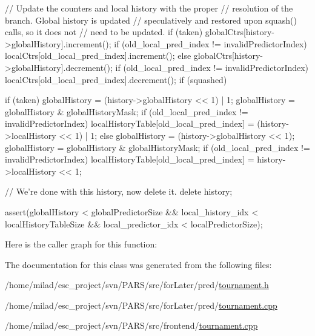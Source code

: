 \begin{DoxyCode}
{{{             // Update the counters and local history with the proper
             // resolution of the branch.  Global history is updated
             // speculatively and restored upon squash() calls, so it does not
             // need to be updated.
             if (taken) {
                  globalCtrs[history->globalHistory].increment();
                  if (old_local_pred_index != invalidPredictorIndex) {
                          localCtrs[old_local_pred_index].increment();
                  }
             } else {
                  globalCtrs[history->globalHistory].decrement();
                  if (old_local_pred_index != invalidPredictorIndex) {
                          localCtrs[old_local_pred_index].decrement();
                  }
             }
        }
        if (squashed) {
             if (taken) {
                globalHistory = (history->globalHistory << 1) | 1;
                globalHistory = globalHistory & globalHistoryMask;
                if (old_local_pred_index != invalidPredictorIndex) {
                    localHistoryTable[old_local_pred_index] =
                     (history->localHistory << 1) | 1;
                }
             } else {
                globalHistory = (history->globalHistory << 1);
                globalHistory = globalHistory & globalHistoryMask;
                if (old_local_pred_index != invalidPredictorIndex) {
                     localHistoryTable[old_local_pred_index] =
                     history->localHistory << 1;
                }
             }

        }
        // We're done with this history, now delete it.
        delete history;

    }

    assert(globalHistory < globalPredictorSize &&
           local_history_idx < localHistoryTableSize &&
           local_predictor_idx < localPredictorSize);


}
\end{DoxyCode}


Here is the caller graph for this function:




The documentation for this class was generated from the following files:\begin{DoxyCompactItemize}
\item 
/home/milad/esc\_\-project/svn/PARS/src/forLater/pred/\hyperlink{tournament_8h}{tournament.h}\item 
/home/milad/esc\_\-project/svn/PARS/src/forLater/pred/\hyperlink{forLater_2pred_2tournament_8cpp}{tournament.cpp}\item 
/home/milad/esc\_\-project/svn/PARS/src/frontend/\hyperlink{frontend_2tournament_8cpp}{tournament.cpp}\end{DoxyCompactItemize}
